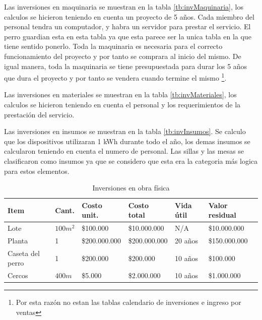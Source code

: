 \documentclass[a4paper, 12pt, oneside]{article}
\begin{document}
	Las inversiones en maquinaria se muestran en la tabla \ref{tb:invMaquinaria}, los calculos se hicieron teniendo en cuenta un proyecto de 5 años. Cada miembro del personal tendra un computador, y habra un servidor para prestar el servicio. El perro guardian esta en esta tabla ya que esta parece ser la unica tabla en la que tiene sentido ponerlo. Toda la maquinaria es necesaria para el correcto funcionamiento del proyecto y por tanto se comprara al inicio del mismo. De igual manera, toda la maquinaria se tiene presupuestada para durar los 5 años que dura el proyecto y por tanto se vendera cuando termine el mismo \footnote{Por esta razón no estan las tablas calendario de inversiones e ingreso por ventas}.
	
	Las inversiones en materiales se muestran en la tabla \ref{tb:invMateriales}, los calculos se hicieron teniendo en cuenta el personal y los requerimientos de la prestación del servicio.

	Las inversiones en insumos se muestran en la tabla \ref{tb:invInsumos}. Se calculo que los dispositivos utilizaran 1 kWh durante todo el año, los demas insumos se calcularon teniendo en cuenta el numero de personal. Las sillas y las mesas se clasificaron como insumos ya que se considero que esta era la categoria más logica para estos elementos.
	
	\begin{table}
		\caption{Inversiones en obra física}
		\begin{tabular}{ | p{3cm} | p{1cm} | p{2.5cm} | p{2.5cm} | p{1cm} | p{2.2cm} | }
		\hline
		Item & Cant. & Costo unit. & Costo total & Vida útil & Valor residual \\
		\hline					
		Lote & $100m^2$ & \$100.000 & \$10.000.000 & N/A & \$10.000.000 \\
		\hline					
		Planta & 1 & \$200.000.000 & \$200.000.000 & 20 años & \$150.000.000 \\
		\hline
		Caseta del perro & 1 & \$200.000 & \$200.000 & 10 años & \$100.000 \\ 
		\hline
		Cercos & $400m$ & \$5.000 & \$2.000.000 & 10 años & \$1.000.000 \\
		\hline
		\end{tabular}
		\label{tb:invFisica}
	\end{table}
\end{document}
